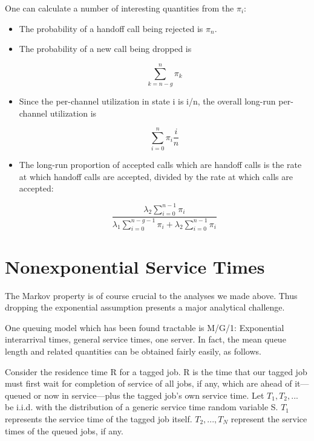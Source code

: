 One can calculate a number of interesting quantities from the $\pi_i$:

\begin{itemize}

\item The probability of a handoff call being rejected is $\pi_n$.  

\item The probability of a new call being dropped is

\begin{equation}
\sum_{k=n-g}^{n} \pi_k
\end{equation}

\item Since the per-channel utilization in state i is i/n, the overall
long-run per-channel utilization is

\begin{equation}
\sum_{i=0}^n \pi_i \frac{i}{n} 
\end{equation}

\item The long-run proportion of accepted calls which are handoff calls
is the rate at which handoff calls are accepted, divided by the rate at
which calls are accepted:

\begin{equation}
\frac{\lambda_2 \sum_{i=0}^{n-1} \pi_i} 
{\lambda_1 \sum_{i=0}^{n-g-1} \pi_i + \lambda_2 \sum_{i=0}^{n-1} \pi_i}
\end{equation}


\end{itemize}



\section{Nonexponential Service Times}

The Markov property is of course crucial to the analyses we made above.
Thus dropping the exponential assumption presents a major analytical
challenge.

One queuing model which has been found tractable is M/G/1:  Exponential
interarrival times, general service times, one server.  In fact, the
mean queue length and related quantities can be obtained fairly easily,
as follows.

Consider the residence time R for a tagged job.  R is the time that our
tagged job must first wait for completion of service of all jobs, if
any, which are ahead of it---queued or now in service---plus the tagged
job's own service time.  Let $T_1, T_2,...$ be i.i.d. with the
distribution of a generic service time random variable S.  $T_1$
represents the service time of the tagged job itself.  $T_2,...,T_N$
represent the service times of the queued jobs, if any.

